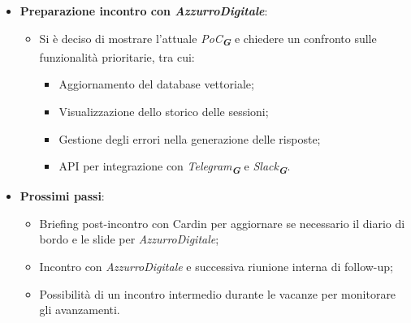 \begin{itemize}
    \item \textbf{Preparazione incontro con \emph{AzzurroDigitale}}:  
    \begin{itemize}
        \item Si è deciso di mostrare l'attuale \emph{PoC}\textsubscript{\textit{\textbf{G}}} e chiedere un confronto sulle funzionalità prioritarie, tra cui:  
        \begin{itemize}
            \item Aggiornamento del database vettoriale;
            \item Visualizzazione dello storico delle sessioni;
            \item Gestione degli errori nella generazione delle risposte;
            \item API per integrazione con \emph{Telegram}\textsubscript{\textit{\textbf{G}}} e \emph{Slack}\textsubscript{\textit{\textbf{G}}}.  
        \end{itemize}
    \end{itemize}
    \item \textbf{Prossimi passi}:  
    \begin{itemize}
        \item Briefing post-incontro con Cardin per aggiornare se necessario il diario di bordo e le slide per \emph{AzzurroDigitale};
        \item Incontro con \emph{AzzurroDigitale} e successiva riunione interna di follow-up;
        \item Possibilità di un incontro intermedio durante le vacanze per monitorare gli avanzamenti.  
    \end{itemize}
\end{itemize}
